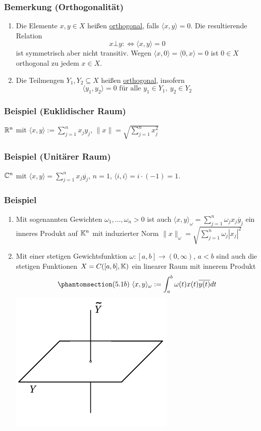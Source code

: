 \subsubsection{Bemerkung (Orthogonalität)}
\begin{enumerate}
\item Die Elemente $x,y\in X$ heißen \underline{orthogonal}, falls $\langle x,y\rangle=0$.  Die resultierende Relation 
\[x \bot y :\Leftrightarrow \langle x,y\rangle=0\]
ist symmetrisch aber nicht transitiv.  Wegen $\langle x,0\rangle=\langle0,x\rangle=0$ ist $0\in X$ orthogonal zu jedem $x\in X$.
\item Die Teilmengen $Y_1,Y_2\subseteq X$ heißen \underline{orthogonal}, insofern
\[\langle y_1,y_2\rangle=0\text{ für alle }y_1\in Y_1,\ y_2\in Y_2\]
\end{enumerate}
\subsubsection{Beispiel (Euklidischer Raum)}
$\mathbb{R} ^n$ mit $\langle x,y\rangle:=\sum _{j=1}^n x_jy_j$, $\|x\|=\sqrt{\sum _{j=1}^nx_j^2}$
\subsubsection{Beispiel (Unitärer Raum)}
$\mathbb{C} ^n$ mit $\langle x,y\rangle=\sum _{j=1}^n x_j \overline{y_j}$, $n=1$, $\langle i,i\rangle=i\cdot (-1)=1$.
\subsubsection{Beispiel}
\label{5.1.6}
\numbers
\begin{enumerate}
\item Mit sogenannten Gewichten $\omega_1,\dots,\omega_n>0$ ist auch $\langle x,y \rangle_\omega=\sum_{j=1}^n \omega_j x_j \overline{y}_j$ ein inneres Produkt auf $\mathbb{K}^n$ mit induzierter Norm $\|x\|_\omega= \sqrt{\sum_{j=1}^n \omega_j |x_j|^2}$
\item Mit einer stetigen Gewichtsfunktion $\omega\colon[a,b]\rightarrow(0,\infty)$, $a<b$ sind auch die stetigen Funktionen $X=C([a,b],\mathbb{K})$ ein linearer Raum mit innerem Produkt
\[\phantomsection\label{5.1b}(5.1b)\ \langle x, y\rangle_\omega:=\int_a^b \omega(t)x(t)\overline{y(t)}dt\]
\includegraphics[scale=0.4]{5-1-6.jpg}
\end{enumerate}
